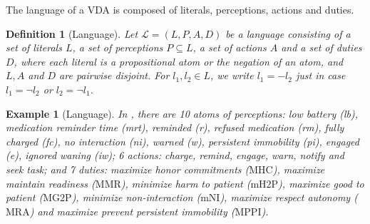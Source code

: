 \documentclass[letterpaper]{article} %
\newtheorem{definition}{Definition}
\newtheorem{example}{Example}
\begin{document}


The language of a VDA is composed of literals, perceptions, actions and duties.


\begin{definition}[Language]
Let $\mathcal{L} = (L, P, A, D)$ be a language consisting of a set of literals $L$, a set of perceptions $P \subseteq L$, a set of actions $A$ and a set of duties $D$, where each literal is a propositional atom or the negation of an atom, and $L, A$ and $D$ are pairwise disjoint. For $l_1, l_2\in L$, we write $l_1 = - l_2$ just in case $l_1 = \neg l_2$ or $l_2 = \neg l_1$. 
\end{definition}

\begin{example}[Language]
In \cite{DBLP:journals/pieee/Anderson19}, there are 10 atoms of perceptions: low battery (lb), medication reminder time (mrt), reminded (r), refused medication (rm), fully charged (fc), no interaction (ni), warned (w), persistent immobility (pi), engaged (e), ignored waning (iw);  6 actions: charge, remind, engage, warn, notify and seek task; and 7 duties: maximize honor commitments ($\mathrm{MHC}$), maximize maintain readiness ($\mathrm{MMR}$), minimize harm to patient ($\mathrm{mH2P}$), maximize good to patient ($\mathrm{MG2P}$), minimize non-interaction ($\mathrm{mNI}$), maximize respect autonomy ($\mathrm{MRA}$) and maximize prevent persistent immobility ($\mathrm{MPPI}$).
\end{example}
\end{document}
